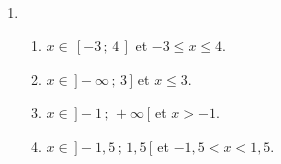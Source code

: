 \ \\ [-10mm]
   \begin{minipage}{6.5cm}
      \begin{enumerate}
         \item
            \begin{enumerate}
               \item {\blue $x\in\,[-3\,;\,4\,]$} et {\blue $-3\leq x\leq 4$}.
               \item {\blue $x\in\,]-\infty\,;\,3\,]$} et {\blue $x\leq 3$}.
               \item {\blue $x\in\,]-1\,;\,+\infty\,[$} et {\blue $x>-1$}.
               \item {\blue $x\in\,]-1,5\,;\,1,5\,[$} et {\blue $-1,5< x<1,5$}.
            \end{enumerate}
      \end{enumerate}
   \end{minipage}
